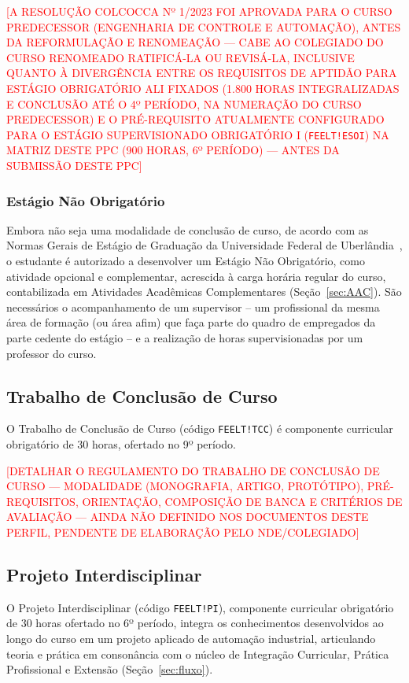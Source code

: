 \textcolor{red}{[A RESOLUÇÃO COLCOCCA Nº 1/2023 FOI APROVADA PARA O CURSO PREDECESSOR (ENGENHARIA DE CONTROLE E AUTOMAÇÃO), ANTES DA REFORMULAÇÃO E RENOMEAÇÃO — CABE AO COLEGIADO DO CURSO RENOMEADO RATIFICÁ-LA OU REVISÁ-LA, INCLUSIVE QUANTO À DIVERGÊNCIA ENTRE OS REQUISITOS DE APTIDÃO PARA ESTÁGIO OBRIGATÓRIO ALI FIXADOS (1.800 HORAS INTEGRALIZADAS E CONCLUSÃO ATÉ O 4º PERÍODO, NA NUMERAÇÃO DO CURSO PREDECESSOR) E O PRÉ-REQUISITO ATUALMENTE CONFIGURADO PARA O ESTÁGIO SUPERVISIONADO OBRIGATÓRIO I (\texttt{FEELT!ESOI}) NA MATRIZ DESTE PPC (900 HORAS, 6º PERÍODO) — ANTES DA SUBMISSÃO DESTE PPC]}

\subsubsection{Estágio Não Obrigatório}

Embora não seja uma modalidade de conclusão de curso, de acordo com as Normas Gerais de Estágio de Graduação da Universidade Federal de Uberlândia~\cite{ufu_congrad_93_2023}, o estudante é autorizado a desenvolver um Estágio Não Obrigatório, como atividade opcional e complementar, acrescida à carga horária regular do curso, contabilizada em Atividades Acadêmicas Complementares (Seção~\ref{sec:AAC}). São necessários o acompanhamento de um supervisor -- um profissional da mesma área de formação (ou área afim) que faça parte do quadro de empregados da parte cedente do estágio -- e a realização de horas supervisionadas por um professor do curso.

\subsection{Trabalho de Conclusão de Curso}

O Trabalho de Conclusão de Curso (código \texttt{FEELT!TCC}) é componente curricular obrigatório de 30 horas, ofertado no 9º período.

\textcolor{red}{[DETALHAR O REGULAMENTO DO TRABALHO DE CONCLUSÃO DE CURSO — MODALIDADE (MONOGRAFIA, ARTIGO, PROTÓTIPO), PRÉ-REQUISITOS, ORIENTAÇÃO, COMPOSIÇÃO DE BANCA E CRITÉRIOS DE AVALIAÇÃO — AINDA NÃO DEFINIDO NOS DOCUMENTOS DESTE PERFIL, PENDENTE DE ELABORAÇÃO PELO NDE/COLEGIADO]}

\subsection{Projeto Interdisciplinar}

O Projeto Interdisciplinar (código \texttt{FEELT!PI}), componente curricular obrigatório de 30 horas ofertado no 6º período, integra os conhecimentos desenvolvidos ao longo do curso em um projeto aplicado de automação industrial, articulando teoria e prática em consonância com o núcleo de Integração Curricular, Prática Profissional e Extensão (Seção~\ref{sec:fluxo}).

